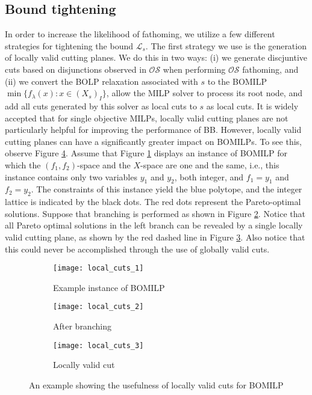 \documentclass[11.5pt]{article}
\renewcommand{\L}{\mathcal{L}}
\newcommand{\OS}{\mathcal{OS}}
\begin{document}
\subsection{Bound tightening}\label{sec:tight}
In order to increase the likelihood of fathoming, we utilize a few different strategies for tightening the bound $\L_s$. The first strategy we use is the generation of locally valid cutting planes. We do this in two ways: (i) we generate discjuntive cuts based on disjunctions observed in $\OS$ when performing $\OS$ fathoming, and (ii) we convert the BOLP relaxation associated with $s$ to the BOMILP $\min\{f_\lambda(x): x\in ({X}_s)_I\}$, allow the MILP solver to process its root node, and add all cuts generated by this solver as local cuts to $s$ as local cuts. It is widely accepted that for single objective MILPs, locally valid cutting planes are not particularly helpful for improving the performance of BB. However, locally valid cutting planes can have a significantly greater impact on BOMILPs. To see this, observe Figure \ref{local_cuts}. Assume that Figure \ref{local_cuts_1} displays an instance of BOMILP for which the $(f_1,f_2)$-space and the $X$-space are one and the same, i.e., this instance contains only two variables $y_1$ and $y_2$, both integer, and $f_1 = y_1$ and $f_2 = y_2$. The constraints of this instance yield the blue polytope, and the integer lattice is indicated by the black dots. The red dots represent the Pareto-optimal solutions. Suppose that branching is performed as shown in Figure \ref{local_cuts_2}. Notice that all Pareto optimal solutions in the left branch can be revealed by a single locally valid cutting plane, as shown by the red dashed line in Figure \ref{local_cuts_3}. Also notice that this could never be accomplished through the use of globally valid cuts.

\begin{figure}
\begin{subfigure}[h]{.32\textwidth}
\centering
\texttt{[image: local\_cuts\_1]}
\caption{Example instance of BOMILP}
\label{local_cuts_1}
\end{subfigure} 
\begin{subfigure}[h]{.33\textwidth}
\centering
\texttt{[image: local\_cuts\_2]}
\caption{After branching}
\label{local_cuts_2}
\end{subfigure}
\begin{subfigure}[h]{.32\textwidth}
\centering
\texttt{[image: local\_cuts\_3]}
\caption{Locally valid cut}
\label{local_cuts_3}
\end{subfigure}
\caption{An example showing the usefulness of locally valid cuts for BOMILP}
\label{local_cuts}
\end{figure}
\end{document}
